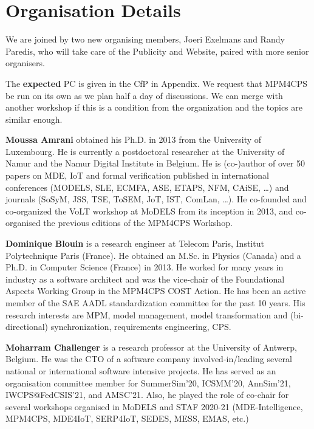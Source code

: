 \section{Organisation Details}
\label{sec:Organisation}

We are joined by two new organising members, Joeri Exelmans and Randy Paredis, 
who will take care of the Publicity and Website, paired with more senior organisers.

The \textbf{expected} PC is given in the CfP in Appendix.
We request that MPM4CPS be run on its own as we plan half a day of discussions.
We can merge with another workshop if this is a condition from the organization 
and the topics are similar enough.

\medskip
\noindent
\textbf{Moussa Amrani} obtained his Ph.D. in 2013 from the University of Luxembourg. 
He is currently a postdoctoral researcher at the University of Namur and the Namur Digital Institute in Belgium. 
He is (co-)author of over 50 papers on MDE, IoT and formal verification published in international conferences (MODELS, SLE, ECMFA, ASE, ETAPS, NFM, CAiSE, \ldots) and journals (SoSyM, JSS, TSE, ToSEM, JoT, IST, ComLan, \ldots). He co-founded and co-organized the VoLT workshop at MoDELS from its inception in 2013, and co-organised
the previous editions of the MPM4CPS Workshop.

\medskip
\noindent
\textbf{Dominique Blouin} is a research engineer at Telecom Paris, Institut Polytechnique Paris 
(France). He obtained an M.Sc. in Physics (Canada) and a Ph.D. in Computer Science (France) in 2013. He worked for many years in industry as a software architect and was the vice-chair of the Foundational Aspects Working Group in the MPM4CPS COST Action. He has been an active member of the SAE AADL standardization committee for the past 10 years. His research interests are MPM, model management, model transformation and (bi-directional) synchronization, requirements engineering, CPS.

\medskip
\noindent
\textbf{Moharram Challenger} is a research professor at the University of Antwerp, Belgium. He was the CTO of a software company involved-in/leading several national or international software intensive projects. He has served as an organisation committee member for SummerSim'20, ICSMM'20, AnnSim'21, IWCPS@FedCSIS'21, and AMSC'21. Also, he played the role of co-chair for several workshops organised in MoDELS and STAF 2020-21 (MDE-Intelligence, MPM4CPS, MDE4IoT, SERP4IoT, SEDES, MESS, EMAS, etc.)

